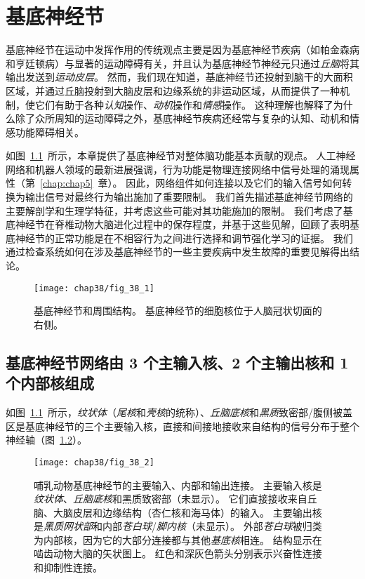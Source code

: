 \chapter{基底神经节} \label{chap:chap38}

基底神经节在运动中发挥作用的传统观点主要是因为基底神经节疾病（如帕金森病和亨廷顿病）与显著的运动障碍有关，并且认为基底神经节神经元只通过\textit{丘脑}将其输出发送到\textit{运动皮层}。
然而，我们现在知道，基底神经节还投射到脑干的大面积区域，并通过丘脑投射到大脑皮层和边缘系统的非运动区域，从而提供了一种机制，使它们有助于各种\textit{认知}操作、\textit{动机}操作和\textit{情感}操作。
这种理解也解释了为什么除了众所周知的运动障碍之外，基底神经节疾病还经常与复杂的认知、动机和情感功能障碍相关。




如图~\ref{fig:38_1}~所示，本章提供了基底神经节对整体脑功能基本贡献的观点。
人工神经网络和机器人领域的最新进展强调，行为功能是物理连接网络中信号处理的涌现属性（第~\ref{chap:chap5}~章）。
因此，网络组件如何连接以及它们的输入信号如何转换为输出信号对最终行为输出施加了重要限制。
我们首先描述基底神经节网络的主要解剖学和生理学特征，并考虑这些可能对其功能施加的限制。
我们考虑了基底神经节在脊椎动物大脑进化过程中的保存程度，并基于这些见解，回顾了表明基底神经节的正常功能是在不相容行为之间进行选择和调节强化学习的证据。
我们通过检查系统如何在涉及基底神经节的一些主要疾病中发生故障的重要见解得出结论。


\begin{figure}[htbp]
	\centering
	\texttt{[image: chap38/fig\_38\_1]}
	\caption{基底神经节和周围结构。
		基底神经节的细胞核位于人脑冠状切面的右侧\cite{nieuwenhuys2007human}。}
	\label{fig:38_1}
\end{figure}



\section{基底神经节网络由 3 个主输入核、2 个主输出核和 1 个内部核组成}

如图~\ref{fig:38_1}~所示，\textit{纹状体}（\textit{尾核}和\textit{壳核}的统称）、\textit{丘脑底核}和\textit{黑质}致密部/腹侧被盖区是基底神经节的三个主要输入核，直接和间接地接收来自结构的信号分布于整个神经轴（图~\ref{fig:38_2}）。


\begin{figure}[htbp]
	\centering
	\texttt{[image: chap38/fig\_38\_2]}
	\caption{哺乳动物基底神经节的主要输入、内部和输出连接。
		主要输入核是\textit{纹状体}、\textit{丘脑底核}和黑质致密部（未显示）。
		它们直接接收来自丘脑、大脑皮层和边缘结构（杏仁核和海马体）的输入。
		主要输出核是\textit{黑质网状部}和内部\textit{苍白球}/\textit{脚内核}（未显示）。
		外部\textit{苍白球}被归类为内部核，因为它的大部分连接都与其他\textit{基底核}相连。
		结构显示在啮齿动物大脑的矢状图上。
		红色和深灰色箭头分别表示兴奋性连接和抑制性连接。}
	\label{fig:38_2}
\end{figure}



